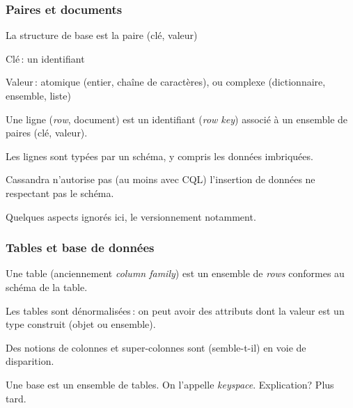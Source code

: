 \begin{frame}
\frametitle{Paires et documents}

La structure de base est la paire (clé, valeur)

\begin{redbullet}
 \item Clé\,: un identifiant
 \item Valeur\,:  atomique (entier, chaîne de caractères), ou complexe (dictionnaire, ensemble, liste)
\end{redbullet}

\vfill

Une ligne (\textit{row}, document) est un identifiant (\textit{row key}) associé à un ensemble de paires (clé, valeur).

\vfill

Les lignes sont \alert{typées} par un schéma, y compris les données imbriquées.

\vfill

Cassandra n'autorise pas (au moins avec CQL) l'insertion de données ne respectant pas le schéma.

\vfill

\alert{Quelques aspects ignorés ici}, le versionnement notamment.
\end{frame}


\begin{frame}
\frametitle{Tables et base de données}

Une \alert{table} (anciennement \textit{column family}) est un ensemble de \textit{rows} conformes
au schéma de la table.

\vfill

Les tables sont \alert{dénormalisées}\,: on peut avoir des attributs dont
la valeur est un type construit (objet ou ensemble).
\vfill

Des notions de colonnes et super-colonnes sont (semble-t-il) en voie de disparition.

\vfill

Une \alert{base} est un ensemble de tables. On l'appelle \textit{keyspace}. Explication? Plus tard.

\end{frame}


